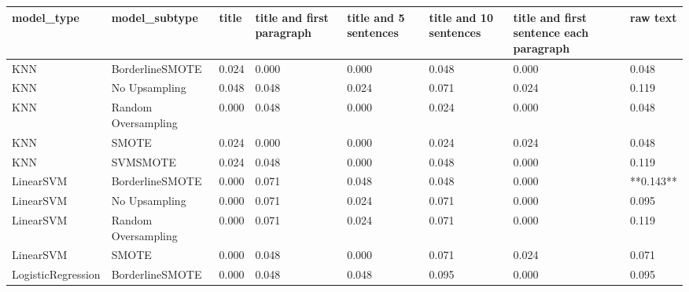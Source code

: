 \begin{tabular}{llllllll}
\toprule
                  model\_type &       model\_subtype & title & title and first paragraph & title and 5 sentences & title and 10 sentences & title and first sentence each paragraph &  raw text \\
\midrule
                         KNN &     BorderlineSMOTE & 0.024 &                     0.000 &                 0.000 &                  0.048 &                                   0.000 &     0.048 \\
                         KNN &       No Upsampling & 0.048 &                     0.048 &                 0.024 &                  0.071 &                                   0.024 &     0.119 \\
                         KNN & Random Oversampling & 0.000 &                     0.048 &                 0.000 &                  0.024 &                                   0.000 &     0.048 \\
                         KNN &               SMOTE & 0.024 &                     0.000 &                 0.000 &                  0.024 &                                   0.024 &     0.048 \\
                         KNN &            SVMSMOTE & 0.024 &                     0.048 &                 0.000 &                  0.048 &                                   0.000 &     0.119 \\
                   LinearSVM &     BorderlineSMOTE & 0.000 &                     0.071 &                 0.048 &                  0.048 &                                   0.000 & **0.143** \\
                   LinearSVM &       No Upsampling & 0.000 &                     0.071 &                 0.024 &                  0.071 &                                   0.000 &     0.095 \\
                   LinearSVM & Random Oversampling & 0.000 &                     0.071 &                 0.024 &                  0.071 &                                   0.000 &     0.119 \\
                   LinearSVM &               SMOTE & 0.000 &                     0.048 &                 0.000 &                  0.071 &                                   0.024 &     0.071 \\
          LogisticRegression &     BorderlineSMOTE & 0.000 &                     0.048 &                 0.048 &                  0.095 &                                   0.000 &     0.095 \\

\end{tabular}

